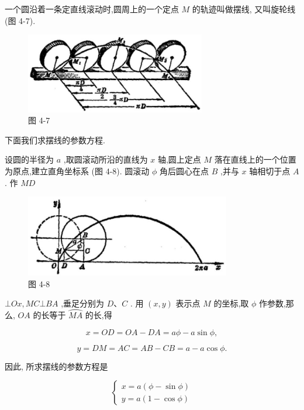 \documentclass[lang=cn,newtx,12pt,scheme=chinese]{elegantbook}
\begin{document}
一个圆沿着一条定直线滚动时,圆周上的一个定点 \(M\) 的轨迹叫做摆线, 又叫旋轮线 (图 4-7).

\begin{figure}[h]
  \centering
  \includegraphics[max width=0.7\textwidth]{images/01912cc2-ffb6-728e-9ae7-b113ff05c64b_169_676481.jpg}
  \caption{图 4-7}
\end{figure}

下面我们求摆线的参数方程.

设圆的半径为 \(a\) ,取圆滚动所沿的直线为 \(x\) 轴,圆上定点 \(M\) 落在直线上的一个位置为原点,建立直角坐标系 (图 4-8). 圆滚动 \(\phi\) 角后圆心在点 \(B\) ,并与 \(x\) 轴相切于点 \(A\) . 作 \({MD}\)

\begin{figure}[h]
  \centering
  \includegraphics[max width=0.8\textwidth]{images/01912cc2-ffb6-728e-9ae7-b113ff05c64b_169_875701.jpg}
  \caption{图 4-8}
\end{figure}

\(\bot {Ox},{MC} \bot {BA}\) ,垂足分别为 \(D\text{、}C\) . 用 \(\left( {x,y}\right)\) 表示点 \(M\) 的坐标,取 \(\phi\) 作参数,那么, \({OA}\) 的长等于 \(\overset{⏜}{MA}\) 的长,得

\[
  x = {OD} = {OA} - {DA} = {a\phi } - a\sin \phi ,
\]

\[
  y = {DM} = {AC} = {AB} - {CB} = a - a\cos \phi .
\]

因此, 所求摆线的参数方程是

\[
  \left\{ \begin{array}{l} x = a\left( {\phi - \sin \phi }\right) \\ y = a\left( {1 - \cos \phi }\right) \end{array}\right.
\]
\end{document}
